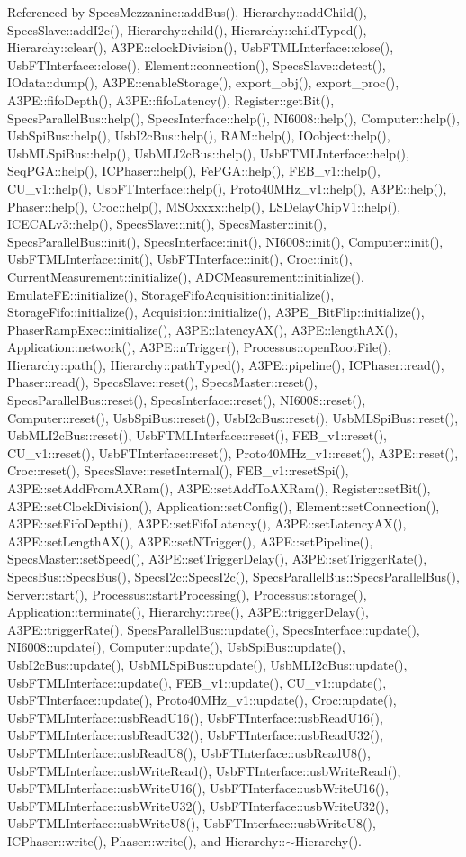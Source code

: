 Referenced by SpecsMezzanine::addBus(), Hierarchy::addChild(), SpecsSlave::addI2c(), Hierarchy::child(), Hierarchy::childTyped(), Hierarchy::clear(), A3PE::clockDivision(), UsbFTMLInterface::close(), UsbFTInterface::close(), Element::connection(), SpecsSlave::detect(), IOdata::dump(), A3PE::enableStorage(), export\_\-obj(), export\_\-proc(), A3PE::fifoDepth(), A3PE::fifoLatency(), Register::getBit(), SpecsParallelBus::help(), SpecsInterface::help(), NI6008::help(), Computer::help(), UsbSpiBus::help(), UsbI2cBus::help(), RAM::help(), IOobject::help(), UsbMLSpiBus::help(), UsbMLI2cBus::help(), UsbFTMLInterface::help(), SeqPGA::help(), ICPhaser::help(), FePGA::help(), FEB\_\-v1::help(), CU\_\-v1::help(), UsbFTInterface::help(), Proto40MHz\_\-v1::help(), A3PE::help(), Phaser::help(), Croc::help(), MSOxxxx::help(), LSDelayChipV1::help(), ICECALv3::help(), SpecsSlave::init(), SpecsMaster::init(), SpecsParallelBus::init(), SpecsInterface::init(), NI6008::init(), Computer::init(), UsbFTMLInterface::init(), UsbFTInterface::init(), Croc::init(), CurrentMeasurement::initialize(), ADCMeasurement::initialize(), EmulateFE::initialize(), StorageFifoAcquisition::initialize(), StorageFifo::initialize(), Acquisition::initialize(), A3PE\_\-BitFlip::initialize(), PhaserRampExec::initialize(), A3PE::latencyAX(), A3PE::lengthAX(), Application::network(), A3PE::nTrigger(), Processus::openRootFile(), Hierarchy::path(), Hierarchy::pathTyped(), A3PE::pipeline(), ICPhaser::read(), Phaser::read(), SpecsSlave::reset(), SpecsMaster::reset(), SpecsParallelBus::reset(), SpecsInterface::reset(), NI6008::reset(), Computer::reset(), UsbSpiBus::reset(), UsbI2cBus::reset(), UsbMLSpiBus::reset(), UsbMLI2cBus::reset(), UsbFTMLInterface::reset(), FEB\_\-v1::reset(), CU\_\-v1::reset(), UsbFTInterface::reset(), Proto40MHz\_\-v1::reset(), A3PE::reset(), Croc::reset(), SpecsSlave::resetInternal(), FEB\_\-v1::resetSpi(), A3PE::setAddFromAXRam(), A3PE::setAddToAXRam(), Register::setBit(), A3PE::setClockDivision(), Application::setConfig(), Element::setConnection(), A3PE::setFifoDepth(), A3PE::setFifoLatency(), A3PE::setLatencyAX(), A3PE::setLengthAX(), A3PE::setNTrigger(), A3PE::setPipeline(), SpecsMaster::setSpeed(), A3PE::setTriggerDelay(), A3PE::setTriggerRate(), SpecsBus::SpecsBus(), SpecsI2c::SpecsI2c(), SpecsParallelBus::SpecsParallelBus(), Server::start(), Processus::startProcessing(), Processus::storage(), Application::terminate(), Hierarchy::tree(), A3PE::triggerDelay(), A3PE::triggerRate(), SpecsParallelBus::update(), SpecsInterface::update(), NI6008::update(), Computer::update(), UsbSpiBus::update(), UsbI2cBus::update(), UsbMLSpiBus::update(), UsbMLI2cBus::update(), UsbFTMLInterface::update(), FEB\_\-v1::update(), CU\_\-v1::update(), UsbFTInterface::update(), Proto40MHz\_\-v1::update(), Croc::update(), UsbFTMLInterface::usbReadU16(), UsbFTInterface::usbReadU16(), UsbFTMLInterface::usbReadU32(), UsbFTInterface::usbReadU32(), UsbFTMLInterface::usbReadU8(), UsbFTInterface::usbReadU8(), UsbFTMLInterface::usbWriteRead(), UsbFTInterface::usbWriteRead(), UsbFTMLInterface::usbWriteU16(), UsbFTInterface::usbWriteU16(), UsbFTMLInterface::usbWriteU32(), UsbFTInterface::usbWriteU32(), UsbFTMLInterface::usbWriteU8(), UsbFTInterface::usbWriteU8(), ICPhaser::write(), Phaser::write(), and Hierarchy::$\sim$Hierarchy().


